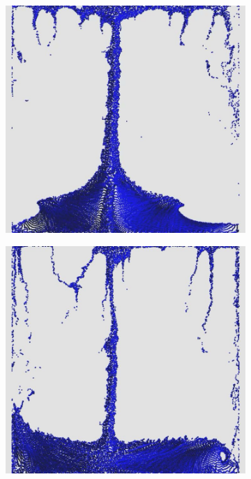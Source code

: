 \documentclass[12pt,a4paper,dvipsnames]{article}
\begin{document}
\begin{figure}[!ht]
\begin{subfigure}[!h]{0.3\textwidth}
	\end{subfigure}
	\begin{subfigure}[!h]{0.3\textwidth} \centering
		\includegraphics[width=\textwidth]{DDB/DDB-08.jpg}
	\end{subfigure}
	\begin{subfigure}[!h]{0.3\textwidth} \centering
		\includegraphics[width=\textwidth]{DDB/DDB-09.jpg}

\end{subfigure}
\end{figure}
\end{document}
